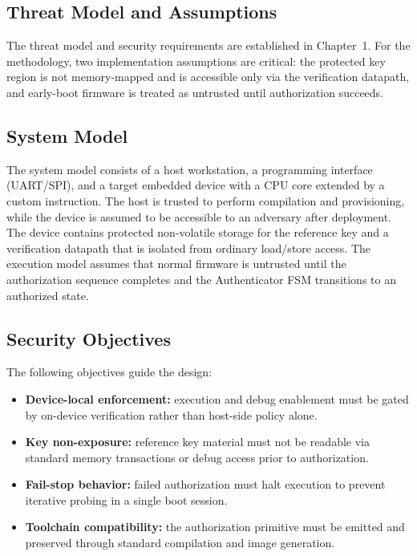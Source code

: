 \subsection{Threat Model and Assumptions}
The threat model and security requirements are established in Chapter~1. For the
methodology, two implementation assumptions are critical: the protected key region is
not memory-mapped and is accessible only via the verification datapath, and early-boot
firmware is treated as untrusted until authorization succeeds.

\subsection{System Model}
The system model consists of a host workstation, a programming interface (UART/SPI), and a
target embedded device with a CPU core extended by a custom instruction. The host is trusted
to perform compilation and provisioning, while the device is assumed to be accessible to an
adversary after deployment. The device contains protected non-volatile storage for the
reference key and a verification datapath that is isolated from ordinary load/store access.
The execution model assumes that normal firmware is untrusted until the authorization sequence
completes and the Authenticator FSM transitions to an authorized state.

\subsection{Security Objectives}
The following objectives guide the design:
\begin{itemize}
  \item \textbf{Device-local enforcement:} execution and debug enablement must be gated by
        on-device verification rather than host-side policy alone.
  \item \textbf{Key non-exposure:} reference key material must not be readable via standard
        memory transactions or debug access prior to authorization.
  \item \textbf{Fail-stop behavior:} failed authorization must halt execution to prevent
        iterative probing in a single boot session.
  \item \textbf{Toolchain compatibility:} the authorization primitive must be emitted and
        preserved through standard compilation and image generation.
\end{itemize}


